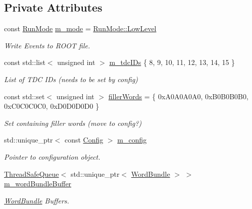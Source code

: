 \subsection*{Private Attributes}
\begin{DoxyCompactItemize}
\item 
const \hyperlink{_modes_enum_8hpp_a3dfe11cf1a3a8121f6cd7fec4bf5947e}{Run\+Mode} \hyperlink{class_processor_ac22f412163181f546d847ce23d71978d}{m\+\_\+mode} = \hyperlink{_modes_enum_8hpp_a3dfe11cf1a3a8121f6cd7fec4bf5947ea8cf5e1a2a32430916501be0579e5303b}{Run\+Mode\+::\+Low\+Level}
\begin{DoxyCompactList}\small\item\em Write Events to R\+O\+OT file. \end{DoxyCompactList}\item 
const std\+::list$<$ unsigned int $>$ \hyperlink{class_processor_a8eaa993665bf2a2ed71f84ffc0630574}{m\+\_\+tdc\+I\+Ds} \{ 8, 9, 10, 11, 12, 13, 14, 15 \}
\begin{DoxyCompactList}\small\item\em List of T\+DC I\+Ds (needs to be set by config) \end{DoxyCompactList}\item 
const std\+::set$<$ unsigned int $>$ \hyperlink{class_processor_a78d13a8646a95290e0b74bdd40c75639}{filler\+Words} = \{ 0x\+A0\+A0\+A0\+A0, 0x\+B0\+B0\+B0\+B0, 0x\+C0\+C0\+C0\+C0, 0x\+D0\+D0\+D0\+D0 \}
\begin{DoxyCompactList}\small\item\em Set containing filler words (move to config?) \end{DoxyCompactList}\item 
std\+::unique\+\_\+ptr$<$ const \hyperlink{class_config}{Config} $>$ \hyperlink{class_processor_aa1ac0a603b269d9f0e1a90ec318c1525}{m\+\_\+config}
\begin{DoxyCompactList}\small\item\em Pointer to configuration object. \end{DoxyCompactList}\item 
\hyperlink{class_thread_safe_queue}{Thread\+Safe\+Queue}$<$ std\+::unique\+\_\+ptr$<$ \hyperlink{class_word_bundle}{Word\+Bundle} $>$ $>$ \hyperlink{class_processor_a1ec54aa38a8c50dc77877e17feed6142}{m\+\_\+word\+Bundle\+Buffer}
\begin{DoxyCompactList}\small\item\em \hyperlink{class_word_bundle}{Word\+Bundle} Buffers. \end{DoxyCompactList}\item 

\end{DoxyCompactItemize}
